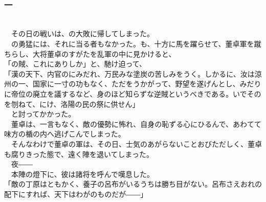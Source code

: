 \documentclass[
  paper=a5,
  fontsize=10pt,
  jafontsize=9.5pt,
  tate,                  %
  open_bracket_pos=nibu, %
]{jlreq}
\begin{document}
\\

\subsection{}

\\

\subsubsection{一}

\\


　その日の戦いは、の大敗に帰してしまった。\\


　の勇猛には、それに当る者もなかった。も、十方に馬を躍らせて、董卓軍を蹴ちらし、大将董卓のすがたを乱軍の中に見かけると、\\


「の賊、これにありしか」と、馳け迫って、\\


「漢の天下、内官のにみだれ、万民みな塗炭の苦しみをうく。しかるに、汝は涼州の一、国家に一寸の功もなく、ただをうかがって、野望を遂げんとし、みだりに帝位の廃立を議するなど、身のほど知らずな逆賊というべきである。いでそのを刎ねて、にけ、洛陽の民の祭に供せん」\\


　と討ってかかった。\\


　董卓は、一言もなく、敵の優勢に怖れ、自身の恥ずる心にひるんで、あわてて味方の楯の内へ逃げこんでしまった。\\


　そんなわけで董卓の軍は、その日、士気のあがらないことおびただしく、董卓も腐りきった態で、遠く陣を退いてしまった。\\


　夜――\\


　本陣の燈下に、彼は諸将を呼んで嘆息した。\\


「敵の丁原はともかく、養子の呂布がいるうちは勝ち目がない。呂布さえおれの配下にすれば、天下はわがのものだが――」\\
\end{document}
